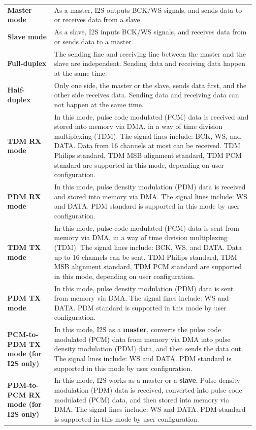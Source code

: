 \documentclass[main\_\_CN.tex]{subfiles}
\begin{document}
\begin{longtable}[c]{ R{4cm} p{10cm} }

\textbf{Master mode}     & As a master, I2S outputs BCK/WS signals, and sends data to or receives data from a slave. \\
\textbf{Slave mode}      & As a slave, I2S inputs BCK/WS signals, and receives data from or sends data to a master. \\
\textbf{Full-duplex} & The sending line and receiving line between the master and the
slave are independent. Sending data and receiving data happen
at the same time.\\
\textbf{Half-duplex} & Only one side, the master or the slave, sends data first, and the
other side receives data. Sending data and receiving data can not
happen at the same time.\\
\textbf{TDM RX mode} & In this mode, pulse code modulated (PCM) data is received and stored into memory via DMA, in a way of time division multiplexing (TDM). The signal lines include: BCK, WS, and DATA. Data from 16 channels at most can be received. TDM Philips standard, TDM MSB alignment standard, TDM PCM standard are supported in this mode, depending on user configuration.\\
\textbf{PDM RX mode} & In this mode, pulse density modulation (PDM) data is received and stored into memory via DMA. The signal lines include: WS and DATA. PDM standard is supported in this mode by user configuration.\\
\textbf{TDM TX mode} & In this mode, pulse code modulated (PCM) data is sent from memory via DMA, in a way of time division multiplexing (TDM). The signal lines include: BCK, WS, and DATA. Data up to 16 channels can be sent. TDM Philips standard, TDM MSB alignment standard, TDM PCM standard are supported in this mode, depending on user configuration.\\
\textbf{PDM TX mode} & In this mode, pulse density modulation (PDM) data is sent from memory via DMA. The signal lines include: WS and DATA. PDM standard is supported in this mode by user configuration.\\
\textbf{PCM-to-PDM TX mode (for I2S only)} & In this mode, I2S as a \textbf{master}, converts the pulse code modulated (PCM) data from memory via DMA into pulse density modulation (PDM) data, and then sends the data out. The signal lines include: WS and DATA. PDM standard is supported in this mode by user configuration.\\
\textbf{PDM-to-PCM RX mode (for I2S only)} & In this mode, I2S works as a master or a \textbf{slave}. Pulse density modulation (PDM) data is received, converted into pulse code modulated (PCM) data, and then stored into memory via DMA. The signal lines include: WS and DATA. PDM standard is supported in this mode by user configuration.\\
\end{longtable}
\end{document}
